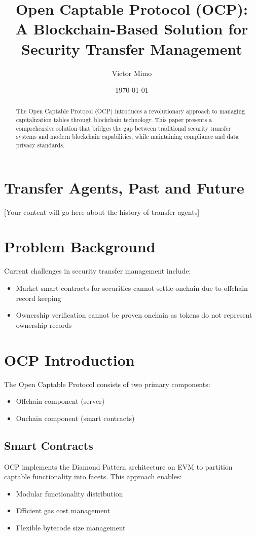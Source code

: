 \documentclass[11pt,a4paper]{article}
\title{\textbf{Open Captable Protocol (OCP):\\A Blockchain-Based Solution for Security Transfer Management}}
\author{Victor Mimo}
\date{\today}
\begin{document}
\maketitle

\begin{abstract}
The Open Captable Protocol (OCP) introduces a revolutionary approach to managing capitalization tables through blockchain technology. This paper presents a comprehensive solution that bridges the gap between traditional security transfer systems and modern blockchain capabilities, while maintaining compliance and data privacy standards.
\end{abstract}

\section{Transfer Agents, Past and Future}
[Your content will go here about the history of transfer agents]

\section{Problem Background}
Current challenges in security transfer management include:
\begin{itemize}
    \item Market smart contracts for securities cannot settle onchain due to offchain record keeping
    \item Ownership verification cannot be proven onchain as tokens do not represent ownership records
\end{itemize}

\section{OCP Introduction}
The Open Captable Protocol consists of two primary components:
\begin{itemize}
    \item Offchain component (server)
    \item Onchain component (smart contracts)
\end{itemize}

\subsection{Smart Contracts}
OCP implements the Diamond Pattern architecture on EVM to partition captable functionality into facets. This approach enables:
\begin{itemize}
    \item Modular functionality distribution
    \item Efficient gas cost management
    \item Flexible bytecode size management
\end{itemize}
\end{document}
